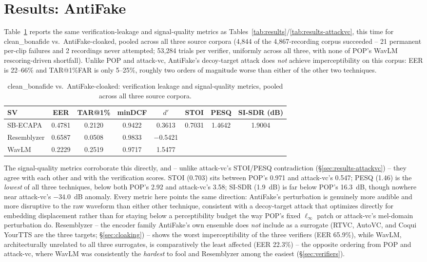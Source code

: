 \documentclass[11pt]{article}
\begin{document}
\section{Results: AntiFake}
\label{sec:results-antifake}

Table~\ref{tab:results-antifake} reports the same verification-leakage
and signal-quality metrics as Tables~\ref{tab:results}/\ref{tab:results-attackvc},
this time for clean\_bonafide vs.\ AntiFake-cloaked, pooled across all
three source corpora (4,844 of the 4,867-recording corpus succeeded --
21 permanent per-clip failures and 2 recordings never attempted;
53,284 trials per verifier, uniformly across all three, with none of
POP's WavLM rescoring-driven shortfall). Unlike POP and
attack-vc, AntiFake's decoy-target attack does \emph{not} achieve
imperceptibility on this corpus: EER is 22--66\% and TAR@1\%FAR is only
5--25\%, roughly two orders of magnitude worse than either of the other
two techniques.

\begin{table}[H]
\centering
\caption{clean\_bonafide vs.\ AntiFake-cloaked: verification leakage and
signal-quality metrics, pooled across all three source corpora.}
\label{tab:results-antifake}
\begin{tabular}{lccccccc}
\toprule
SV & EER & TAR@1\% & minDCF & $d'$ & STOI & PESQ & SI-SDR (dB) \\
\midrule
SB-ECAPA     & 0.4781 & 0.2120 & 0.9422 & 0.3613 & \multirow{3}{*}{0.7031} & \multirow{3}{*}{1.4642} & \multirow{3}{*}{1.9004} \\
Resemblyzer  & 0.6587 & 0.0508 & 0.9833 & $-$0.5421 & & & \\
WavLM        & 0.2229 & 0.2519 & 0.9717 & 1.5477 & & & \\
\bottomrule
\end{tabular}
\end{table}

The signal-quality metrics corroborate this directly, and -- unlike
attack-vc's STOI/PESQ contradiction (\S\ref{sec:results-attackvc}) --
they agree with each other and with the verification scores. STOI
(0.703) sits between POP's 0.971 and attack-vc's 0.547; PESQ (1.46) is
the \emph{lowest} of all three techniques, below both POP's 2.92 and
attack-vc's 3.58; SI-SDR (1.9~dB) is far below POP's 16.3~dB, though
nowhere near attack-vc's $-$34.0~dB anomaly. Every metric here points
the same direction: AntiFake's perturbation is genuinely more audible
and more disruptive to the raw waveform than either other technique,
consistent with a decoy-target attack that optimizes directly for
embedding displacement rather than for staying below a
perceptibility budget the way POP's fixed $\ell_\infty$ patch or
attack-vc's mel-domain perturbation do. Resemblyzer -- the encoder
family AntiFake's own ensemble does \emph{not} include as a surrogate
(RTVC, AutoVC, and Coqui YourTTS are the three targets;
\S\ref{sec:cloaking}) -- shows the worst imperceptibility of the three
verifiers (EER 65.9\%), while WavLM, architecturally unrelated to all
three surrogates, is comparatively the least affected (EER 22.3\%) --
the opposite ordering from POP and attack-vc, where WavLM was
consistently the \emph{hardest} to fool and Resemblyzer among the
easiest (\S\ref{sec:verifiers}).
\end{document}
